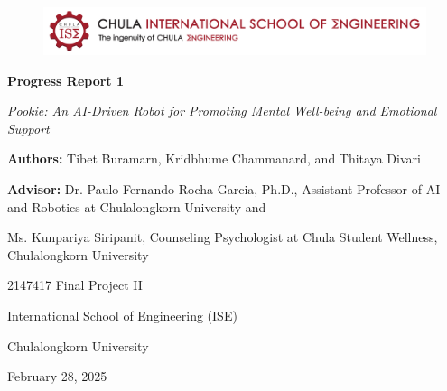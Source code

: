 \documentclass[a4paper,10pt]{article}
\begin{document}
\begin{titlepage}
    \centering  
    \begin{figure}[ht]
        \centering
        \includegraphics[width=\textwidth]{ise-logo.png}
    \end{figure}
    \vspace*{2cm} 
    
    {\Huge \textbf{Progress Report 1} \par}
    {\Huge \textit{Pookie: An AI-Driven Robot for Promoting Mental Well-being and Emotional Support} \par}
    \vspace{4cm}
    
    {\large \textbf{Authors:} Tibet Buramarn, Kridbhume Chammanard, and Thitaya Divari \par}
    \vspace{1cm}
    {\large \textbf{Advisor:} Dr. Paulo Fernando Rocha Garcia, Ph.D., Assistant Professor of AI and Robotics at Chulalongkorn University and \par}
    {\large Ms. Kunpariya Siripanit, Counseling Psychologist at Chula Student Wellness, Chulalongkorn University \par}

    \vspace{3cm}
    
    {\large 2147417 Final Project II \par}
    {\large International School of Engineering (ISE) \par}
    {\large Chulalongkorn University \par}
    
    \vspace{2cm}
    
    {\large February 28, 2025 \par}
    
    \vspace*{\fill}
\end{titlepage}

\thispagestyle{empty}
\end{document}

